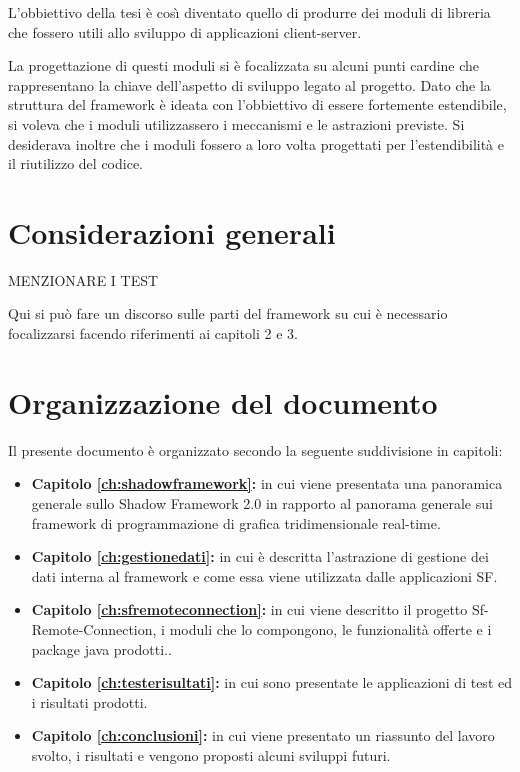 L'obbiettivo della tesi \`e cos{\`\i} diventato quello di produrre dei moduli di libreria che fossero utili allo sviluppo di applicazioni client-server.

La progettazione di questi moduli si \`e focalizzata su alcuni punti cardine che rappresentano la chiave dell'aspetto di sviluppo legato al progetto. Dato che la struttura del framework \`e ideata con l'obbiettivo di essere fortemente estendibile, si voleva che i moduli utilizzassero i meccanismi e le astrazioni previste.
Si desiderava inoltre che i moduli fossero a loro volta progettati per l'estendibilit\`a e il riutilizzo del codice.


\section{Considerazioni generali}
\label{sec:considerazioni}
MENZIONARE I TEST

Qui si pu\`o fare un discorso sulle parti del framework su cui \`e necessario focalizzarsi facendo riferimenti ai capitoli 2 e 3.

\section{Organizzazione del documento}
\label{sec:orgtesi}
Il presente documento \`e organizzato secondo la seguente suddivisione in capitoli:
\begin{itemize}
	\item  \textbf{Capitolo \ref{ch:shadowframework}:} in cui viene presentata una panoramica generale sullo Shadow Framework 2.0 in rapporto al panorama generale sui framework di programmazione di grafica tridimensionale real-time.
	\item  \textbf{Capitolo \ref{ch:gestionedati}:} in cui \`e descritta l'astrazione di gestione dei dati interna al framework e come essa viene utilizzata dalle applicazioni \ac{SF}.
	\item  \textbf{Capitolo \ref{ch:sfremoteconnection}:} in cui viene descritto il progetto Sf-Remote-Connection, i moduli che lo compongono, le funzionalit\`a offerte e i package java prodotti..
	\item  \textbf{Capitolo \ref{ch:testerisultati}:} in cui sono presentate le applicazioni di test ed i risultati prodotti.
	\item  \textbf{Capitolo \ref{ch:conclusioni}:} in cui viene presentato un riassunto del lavoro svolto, i risultati e vengono proposti alcuni sviluppi futuri.
\end{itemize}



